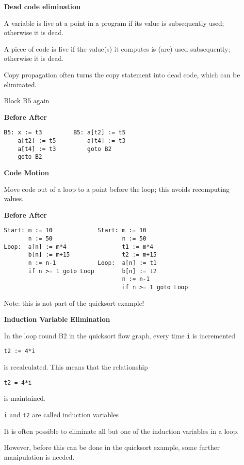 %
%
\begin{slide}{}
{\bf Dead code elimination}

A variable is live at a point in a program if its value is subsequently used;
otherwise it is dead.

A piece of code is live if the value(s) it computes is (are) used subsequently; otherwise it is dead.

Copy propagation often turns the copy statement into dead code, which
can be eliminated.

Block B5 again

{\bf Before  \hspace{7em} After}\\
\begin{verbatim}
B5: x := t3         B5: a[t2] := t5 
    a[t2] := t5         a[t4] := t3
    a[t4] := t3         goto B2 
    goto B2                 
\end{verbatim}

\end{slide}

%
%
\begin{slide}{}
{\small
{\bf Code Motion}

Move code out of a loop to a point before the loop; 
this avoids recomputing values.

{\bf Before \hspace{7em} After}\\
\begin{verbatim}
Start: m := 10             Start: m := 10
       n := 50                    n := 50
Loop:  a[n] := m*4                t1 := m*4
       b[n] := m+15               t2 := m+15
       n := n-1            Loop:  a[n] := t1
       if n >= 1 goto Loop        b[n] := t2
                                  n := n-1
                                  if n >= 1 goto Loop
\end{verbatim}

Note: this is not part of the quicksort example!
}
\end{slide}
%
%
\begin{slide}{}
{\bf Induction Variable Elimination}

In the loop round B2 in the quicksort flow graph, every time {\tt i} is incremented 
\begin{verbatim}
t2 := 4*i
\end{verbatim}
is recalculated.  This means that the relationship
\begin{verbatim}
t2 = 4*i
\end{verbatim}
is maintained.

{\tt i} and {\tt t2} are called induction variables

It is often possible to eliminate all but one of the induction variables
in a loop.

However, before this can be done in the quicksort example, some further
manipulation is needed.
\end{slide}

